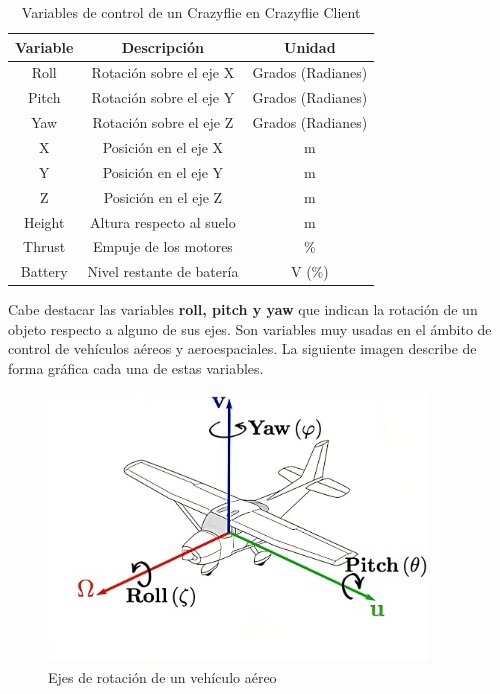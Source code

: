 \begin{table}[h]
\centering
\begin{tabular}{c|c|c}
    \textbf{Variable} & \textbf{Descripción} & \textbf{Unidad} \\ \hline
    Roll     & Rotación sobre el eje X   & Grados (Radianes) \\
    Pitch    & Rotación sobre el eje Y   & Grados (Radianes) \\
    Yaw      & Rotación sobre el eje Z   & Grados (Radianes) \\
    X        & Posición en el eje X      & m                 \\
    Y        & Posición en el eje Y      & m                 \\
    Z        & Posición en el eje Z      & m                 \\
    Height   & Altura respecto al suelo  & m                 \\
    Thrust   & Empuje de los motores     & \%                \\
    Battery  & Nivel restante de batería & V (\%)            
\end{tabular}
    \caption{Variables de control de un Crazyflie en Crazyflie Client}
    \label{tab:crazyflie_client_vars}
\end{table}

Cabe destacar las variables \textbf{roll, pitch y yaw} que indican la rotación de un objeto respecto a alguno de sus ejes.
Son variables muy usadas en el ámbito de control de vehículos aéreos y aeroespaciales. La siguiente imagen describe de forma 
gráfica cada una de estas variables.

\begin{figure}[h]
    \centering
    \includegraphics[width=0.9\textwidth]{img/fig/fig2.4-rotational-axes.jpeg}
    \caption{Ejes de rotación de un vehículo aéreo}
    \label{fig:rotational-axes}
\end{figure}

